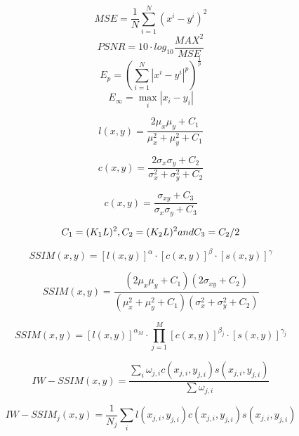\begin{equation}
MSE= \frac{1}{N} \sum_{i=1}^N{(x^i-y^i)^2}
\end{equation}
\begin{equation}
PSNR= 10 \cdot log_{10}\frac{MAX^2}{MSE}
\end{equation}
\begin{equation}
E_p = ( \sum_{i=1}^N{|x^i-y^i|^p})^{\frac{1}{p}}
\end{equation}
\begin{equation}
E_\infty = \max_i{|x_i-y_i|}
\end{equation}

\begin{equation}
l(x, y) = \frac{2\mu_x \mu_y + C_1}{\mu_x^2 + \mu_y^2 + C_1}
\end{equation}

\begin{equation}
c(x, y) = \frac{2\sigma_x \sigma_y + C_2}{\sigma_x^2 + \sigma_y^2 + C_2}
\end{equation}

\begin{equation}
c(x, y) = \frac{\sigma_{xy} + C_3}{\sigma_x \sigma_y + C_3}
\end{equation}

\begin{equation}
C_1 = (K_1 L)^2, C_2 = (K_2 L)^2 \space and \space C_3 = C_2/2
\end{equation}

\begin{equation}
SSIM(x, y) = [l(x, y)]^\alpha \cdot[c(x, y)]^\beta \cdot[s(x, y)]^\gamma
\end{equation} 

\begin{equation}
SSIM(x, y) = \frac{(2\mu_x \mu_y + C_1)(2\sigma_{xy} + C_2)}{(\mu_x^2 + \mu_y^2 + C_1)(\sigma_x^2 + \sigma_y^2 + C_2)}
\end{equation} 

\begin{equation}
SSIM(x, y) = [l(x, y)]^{\alpha_M} \cdot\prod_{j=1}^M{[c(x, y)]^{\beta_j} \cdot[s(x, y)]^{\gamma_j}}
\end{equation} 

\begin{equation}
IW-SSIM(x, y) = \frac{\sum_i{\omega_{j,i}c(x_{j,i},y_{j,i})s(x_{j,i},y_{j,i})}}{\sum{\omega_{j,i}}}
\end{equation} 

\begin{equation}
IW-SSIM_j(x, y) = \frac{1}{N_j}\sum_i{l(x_{j,i},y_{j,i})c(x_{j,i},y_{j,i})s(x_{j,i},y_{j,i})}
\end{equation} 